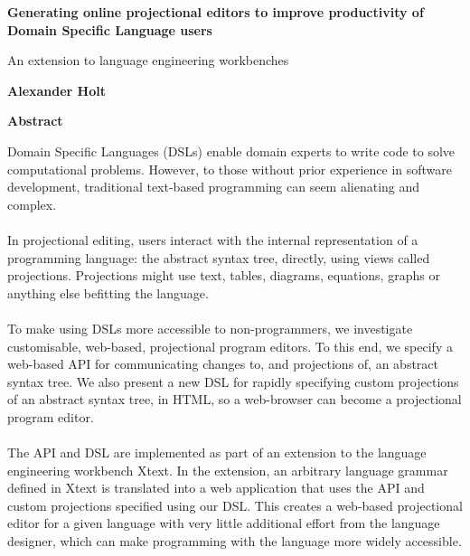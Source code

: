 \documentclass{article}
\begin{document}
\clearpage
%
\thispagestyle{plain}
\begin{center}
    \Large
    \textbf{Generating online projectional editors to improve productivity of Domain Specific Language users}
    
    \vspace{0.4cm}
    \large
    An extension to language engineering workbenches
    
    \vspace{0.4cm}
    \textbf{Alexander Holt}
    
    \vspace{0.9cm}
    \textbf{Abstract}
\end{center}
Domain Specific Languages (DSLs) enable domain experts to write code to solve computational problems. However, to those without  prior experience in software development, traditional text-based programming can seem alienating and complex.
\\
\\
In projectional editing, users interact with the internal representation of a programming language: the abstract syntax tree, directly, using views called projections. Projections might use text, tables, diagrams, equations, graphs or anything else befitting the language.
\\
\\
To make using DSLs more accessible to non-programmers, we investigate customisable, web-based, projectional program editors. To this end, we specify a web-based API for communicating changes to, and projections of, an abstract syntax tree. We also present a new DSL for rapidly specifying custom projections of an abstract syntax tree, in HTML, so a web-browser can become a projectional program editor.
\\
\\
The API and DSL are implemented as part of an extension to the language engineering workbench Xtext. In the extension, an arbitrary language grammar defined in Xtext is translated into a web application that uses the API and custom projections specified using our DSL. This creates a web-based projectional editor for a given language with very little additional effort from the language designer, which can make programming with the language more widely accessible.
\end{document}
